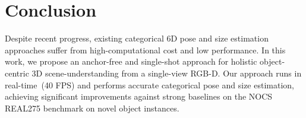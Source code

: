 \documentclass[letter, 10pt, conference]{ieeeconf}
\begin{document}
\section{Conclusion} Despite recent progress, existing categorical 6D pose and size estimation approaches suffer from high-computational cost and low performance. In this work, we propose an anchor-free and single-shot approach for holistic object-centric 3D scene-understanding from a single-view RGB-D. Our approach runs in real-time~(40 FPS) and performs accurate categorical pose and size estimation, achieving significant improvements against strong baselines on the NOCS REAL275 benchmark on novel object instances. 

\end{document}
